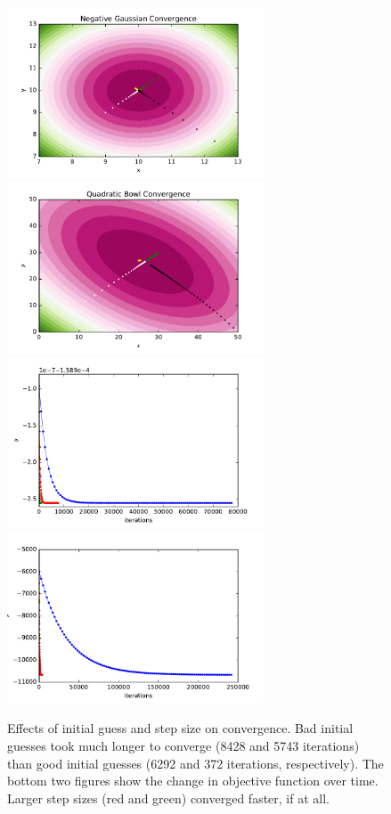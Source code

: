 \documentclass{article}
\begin{document}
\begin{multicols}{2}
\begin{figure}
   \centering
   \includegraphics[width=3in]{img/1-1-gauss.pdf}
   \includegraphics[width=3in]{img/1-1-quad.pdf}
   \includegraphics[width=3in]{img/1-1-etaGauss.pdf}
   \includegraphics[width=3in]{img/1-1-etaQuad.pdf}
   \caption{Effects of initial guess and step size on convergence. Bad initial guesses took much longer to converge (8428 and 5743 iterations) than good initial guesses (6292 and 372 iterations, respectively). The bottom two figures show the change in objective function over time. Larger step sizes (red and green) converged faster, if at all.}
   \label{fig:1.1}
\end{figure}


\end{multicols}
\end{document}
